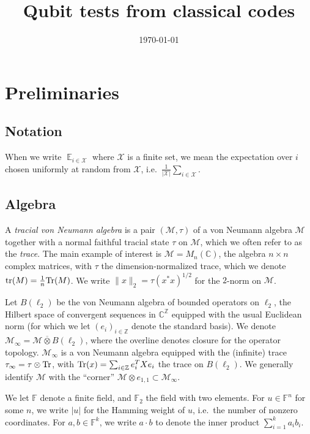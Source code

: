 \documentclass[11pt]{article}
\theoremstyle{definition}
\newcommand{\Tr}{\mbox{\rm Tr}}
\DeclareMathOperator*{\Expectation}{\mathbb{E}}
\newcommand{\Es}[1]{\Expectation_{#1}}
\newcommand{\field}{\mathbb{F}_2}
\newcommand{\C}{\ensuremath{\mathbb{C}}}
\newcommand{\F}{\ensuremath{\mathbb{F}}}
\newcommand{\Z}{\ensuremath{\mathbb{Z}}}
\newcommand{\mM}{\ensuremath{\mathcal{M}}}
\newcommand{\mX}{\ensuremath{\mathcal{X}}}
\DeclareMathOperator{\tr}{tr}
\begin{document}
\title{Qubit tests from classical codes}

\author{}
\date{\today}
\maketitle

\noteswarning


\begin{abstract}

\end{abstract}

	\section{Preliminaries}

\subsection{Notation}

When we write $\Es{i\in \mX}$ where $\mX$ is a finite set, we mean the expectation over $i$ chosen uniformly at random from $\mX$, i.e.\ $\frac{1}{|\mX|} \sum_{i\in \mX}$. 

\subsection{Algebra}

  A \emph{tracial von Neumann algebra} is a pair $(\mM,\tau)$ of a von Neumann algebra $\mM$ together with a normal faithful tracial state $\tau$ on $\mM$, which we often refer to as the \emph{trace}. The main example of interest is $\mM=M_n(\C)$, the algebra $n\times n$ complex matrices, with $\tau$ the dimension-normalized trace, which we denote $\tr(M)=\frac{1}{n}\Tr(M)$. 	We write $\|x\|_2=\tau(x^*x)^{1/2}$ for the $2$-norm on $\mM$.
	
	Let $B(\ell_2)$ be the von Neumann algebra of bounded operators on $\ell_2$, the Hilbert space of convergent sequences in $\C^\Z$ equipped with the usual Euclidean norm (for which we let $(e_i)_{i \in \Z}$ denote the standard basis). We denote $\mM_\infty = \mM \overline{\otimes} B(\ell_2)$, where the overline denotes closure for the operator topology. $\mM_\infty$ is a von Neumann algebra equipped with the (infinite) trace $\tau_\infty = \tau \otimes \Tr$, with $\Tr(x)=\sum_{i\in \Z} e_i^T X e_i$ the trace on $B(\ell_2)$. We generally identify $\mM$ with the ``corner'' $\mM\otimes e_{1,1}\subset \mM_\infty$. 

	We let $\F$ denote a finite field, and $\field$ the field with two elements. For $u\in \F^n$ for some $n$, we write $|u|$ for the Hamming weight of $u$, i.e.\ the number of nonzero coordinates. For $a,b \in \F^k$, we write $a \cdot b$ to denote the inner product $\sum_{i=1}^k a_i b_i$. 
	
\end{document}

